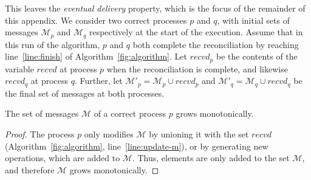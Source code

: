 \documentclass[a4paper,anonymous,USenglish]{lipics-v2019}
\begin{document}
This leaves the \emph{eventual delivery} property, which is the focus of the remainder of this appendix.
We consider two correct processes $p$ and $q$, with initial sets of messages $\mathcal{M}_p$ and $\mathcal{M}_q$ respectively at the start of the execution.
Assume that in this run of the algorithm, $p$ and $q$ both complete the reconciliation by reaching line~\ref{line:finish} of Algorithm~\ref{fig:algorithm}.
Let $\mathit{recvd}_p$ be the contents of the variable $\mathit{recvd}$ at process $p$ when the reconciliation is complete, and likewise $\mathit{recvd}_q$ at process $q$.
Further, let $\mathcal{M}'_p = \mathcal{M}_p \cup \mathit{recvd}_p$ and $\mathcal{M}'_q = \mathcal{M}_q \cup \mathit{recvd}_q$ be the final set of messages at both processes.

\begin{lemma}\label{lemma:no-p-missing}
The set of messages $\mathcal{M}$ of a correct process $p$ grows monotonically.
\end{lemma}
\begin{proof}
The process $p$ only modifies $\mathcal{M}$ by unioning it with the set $\mathit{recvd}$ (Algorithm~\ref{fig:algorithm}, line~\ref{line:update-m}), or by generating new operations, which are added to $\mathcal{M}$.
Thus, elements are only added to the set $\mathcal{M}$, and therefore $\mathcal{M}$ grows monotonically.
\end{proof}
\end{document}
